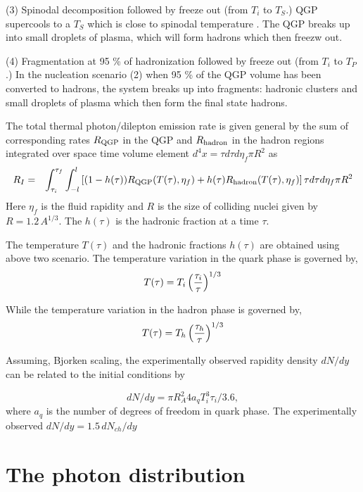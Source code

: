 \documentclass[aps,prc,preprint,superscriptaddress,showpacs,showkeys]{revtex4-1}
\begin{document}
(3) Spinodal decomposition followed by freeze out
             (from $T_i$ to $T_S$.)
   QGP supercools to a $T_S$ which is close to spinodal temperature
 \cite{SPINO}. The QGP breaks up into small droplets of plasma,
which will form hadrons which then freezw out.


(4) Fragmentation at 95 \% of hadronization followed by freeze out
               (from $T_i$ to $T_P$.)
  In the nucleation scenario (2) when 95 \% of the QGP volume has been 
converted to hadrons, the system breaks up into fragments: hadronic clusters 
and small droplets of plasma which then form the final state hadrons. 


  The total thermal photon/dilepton emission rate is given general by 
the sum of corresponding rates $R_{\rm QGP}$ in the QGP and $R_{\rm hadron}$ 
in the hadron regions integrated over space time volume 
element $d^4x = \tau d\tau d\eta_f \pi R^2$ as
\begin{eqnarray}\label{}
R_I  &=& \int_{\tau_i}^{\tau_f} \int_{-l}^{l} 
      \left[(1-h(\tau)) R_{\rm QGP}(T(\tau),\eta_f) 
   + h(\tau)  R_{\rm hadron}(T(\tau),\eta_f) \right]\tau d\tau d\eta_f \pi R^2
\end{eqnarray}
Here $\eta_f$ is the fluid rapidity and $R$ is the size of colliding 
nuclei given by $R=1.2\, A^{1/3}$. The $h(\tau)$ is the hadronic fraction
at a time $\tau$.

 The temperature $T(\tau)$ and the hadronic fractions $h(\tau)$ are
obtained using above two scenario. The temperature variation
in the quark phase is governed by,
\begin{eqnarray}\label{}
T(\tau) = T_i \left({\tau_i \over \tau}\right)^{1/3}
\end{eqnarray}


While the temperature variation in the hadron phase is governed by,
\begin{eqnarray}\label{}
T(\tau) = T_h \left({\tau_h \over \tau}\right)^{1/3}
\end{eqnarray}

 Assuming, Bjorken scaling, the experimentally observed rapidity 
density $dN/dy$ can be related to the initial conditions by

\begin{equation}
dN/dy = \pi R_A^2 4 a_q T_i^3 \tau_i/3.6,
\end{equation}
where $a_q$ is the number of degrees of freedom in quark phase.
The experimentally observed $dN/dy=1.5\, dN_{ch}/dy$ 


\section{The photon distribution}
\end{document}
